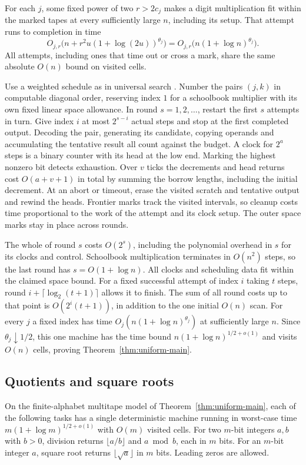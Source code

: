 For each $j$, some fixed power of two $r>2c_j$ makes a digit
multiplication fit within the marked tapes at every sufficiently
large $n$, including its setup. That attempt runs to completion
in time
\[
 O_{j,r}\bigl(n+r^2u(1+\log(2u))^{\theta_j}\bigr)
              =O_{j,r}\bigl(n(1+\log n)^{\theta_j}\bigr).
\]
All attempts, including ones that time out or cross a mark, share
the same absolute $O(n)$ bound on visited cells.

Use a weighted schedule as in universal search \cite{Levin}.
Number the pairs $(j,k)$ in computable diagonal order, reserving
index $1$ for a schoolbook multiplier with its own fixed linear
space allowance. In round $s=1,2,\ldots$, restart the first $s$
attempts in turn. Give index $i$ at most $2^{s-i}$ actual steps
and stop at the first completed output. Decoding the pair, generating
its candidate, copying operands and accumulating the tentative
result all count against the budget. A clock for $2^a$ steps is a
binary counter with its head at the low end. Marking the highest
nonzero bit detects exhaustion. Over $v$ ticks the decrements and
head returns cost $O(a+v+1)$ in total by summing the borrow
lengths, including the initial decrement. At an abort or timeout,
erase the visited scratch and tentative output and rewind the
heads. Frontier marks track the visited intervals, so cleanup
costs time proportional to the work of the attempt and its clock
setup. The outer space marks stay in place across rounds.

The whole of round $s$ costs $O(2^s)$, including the polynomial
overhead in $s$ for its clocks and control. Schoolbook multiplication
terminates in $O(n^2)$ steps, so the last round has $s=O(1+\log n)$.
All clocks and scheduling data fit within the claimed space bound.
For a fixed successful attempt of index $i$ taking $t$ steps,
round $i+\lceil\log_2(t+1)\rceil$ allows it to finish. The sum of
all round costs up to that point is $O(2^i(t+1))$, in addition
to the one initial $O(n)$ scan. For every $j$ a fixed index has
time $O_j(n(1+\log n)^{\theta_j})$ at sufficiently large $n$.
Since $\theta_j\downarrow1/2$, this one machine has the time bound
$n(1+\log n)^{1/2+o(1)}$ and visits $O(n)$ cells, proving
Theorem~\ref{thm:uniform-main}.

\subsection{Quotients and square roots}
\label{sec:exact-arithmetic-applications}

\begin{corollary}\label{cor:near-root-applications}
On the finite-alphabet multitape model of Theorem~\ref{thm:uniform-main},
each of the following tasks has a single deterministic machine running
in worst-case time $m(1+\log m)^{1/2+o(1)}$ with $O(m)$ visited cells.
For two $m$-bit integers $a,b$ with $b>0$, division returns
$\lfloor a/b\rfloor$ and $a\bmod b$, each in $m$ bits. For an
$m$-bit integer $a$, square root returns $\lfloor\sqrt a\rfloor$
in $m$ bits. Leading zeros are allowed.
\end{corollary}

